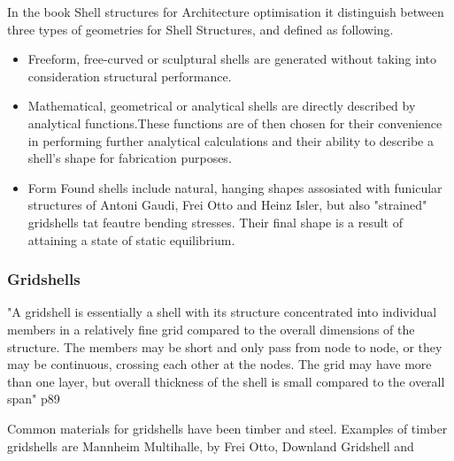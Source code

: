 In the book Shell structures for Architecture optimisation it distinguish between three types of geometries for Shell Structures, and defined as following.

\begin{itemize}
\item Freeform, free-curved or sculptural shells are generated without taking into consideration structural performance.  
\item Mathematical, geometrical or analytical shells are directly described by analytical functions.These functions are of then chosen for their convenience in performing further analytical calculations and their ability to describe a shell's shape for fabrication purposes.
\item Form Found shells include natural, hanging shapes assosiated with funicular structures of Antoni Gaudi, Frei Otto and Heinz Isler, but also "strained" gridshells tat feautre bending stresses. Their final shape is a result of attaining a state of static equilibrium.
\end{itemize}

\subsubsection{Gridshells}


"A gridshell is essentially a  shell with its structure concentrated into individual members in a relatively fine grid compared to the overall dimensions of the structure. The members may be short and only pass from node to node, or they may be continuous, crossing each other at the nodes. The grid may have more than one layer, but overall thickness of the shell is small compared to the overall span" p89

Common materials for gridshells have been timber and steel. Examples of timber gridshells are Mannheim Multihalle, by Frei Otto, Downland Gridshell and 

